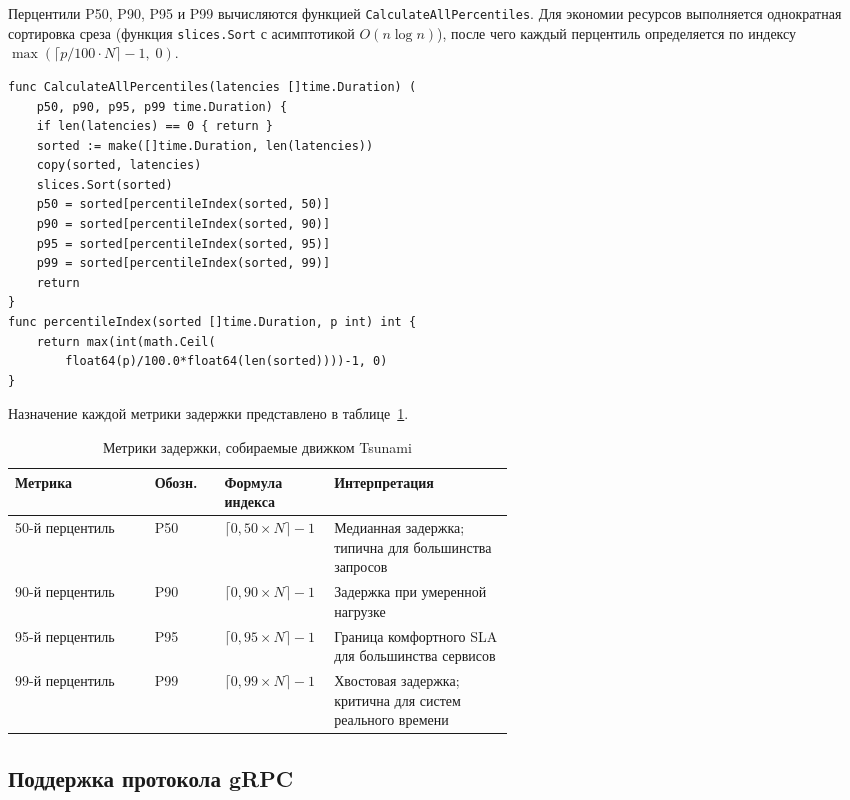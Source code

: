 Перцентили P50, P90, P95 и P99 вычисляются функцией \texttt{Calculate\-All\-Percentiles}.
Для экономии ресурсов выполняется однократная сортировка среза (функция \texttt{slices.Sort} с асимптотикой $O(n \log n)$), после чего каждый перцентиль определяется по индексу \(\max\!\left(\lceil p / 100 \cdot N \rceil - 1,\; 0\right)\).

\begin{lstlisting}[caption={Функция \texttt{CalculateAllPercentiles} и вспомогательная \texttt{percentileIndex}},label={lst:percentile}]
func CalculateAllPercentiles(latencies []time.Duration) (
    p50, p90, p95, p99 time.Duration) {
    if len(latencies) == 0 { return }
    sorted := make([]time.Duration, len(latencies))
    copy(sorted, latencies)
    slices.Sort(sorted)
    p50 = sorted[percentileIndex(sorted, 50)]
    p90 = sorted[percentileIndex(sorted, 90)]
    p95 = sorted[percentileIndex(sorted, 95)]
    p99 = sorted[percentileIndex(sorted, 99)]
    return
}
func percentileIndex(sorted []time.Duration, p int) int {
    return max(int(math.Ceil(
        float64(p)/100.0*float64(len(sorted))))-1, 0)
}
\end{lstlisting}

Назначение каждой метрики задержки представлено в таблице~\ref{tab:ch2-percentiles}.

\begin{table}[h!]
  \centering
  \caption{Метрики задержки, собираемые движком Tsunami}
  \label{tab:ch2-percentiles}
  \small
  \begin{tabular}{|l|l|p{0.22\linewidth}|p{0.36\linewidth}|}
    \hline
    \textbf{Метрика} & \textbf{Обозн.} & \textbf{Формула индекса} & \textbf{Интерпретация} \\
    \hline
    50-й перцентиль & P50 & $\lceil 0{,}50 \times N \rceil - 1$ & Медианная задержка; типична для большинства запросов \\
    \hline
    90-й перцентиль & P90 & $\lceil 0{,}90 \times N \rceil - 1$ & Задержка при умеренной нагрузке \\
    \hline
    95-й перцентиль & P95 & $\lceil 0{,}95 \times N \rceil - 1$ & Граница комфортного SLA для большинства сервисов \\
    \hline
    99-й перцентиль & P99 & $\lceil 0{,}99 \times N \rceil - 1$ & Хвостовая задержка; критична для систем реального времени \\
    \hline
  \end{tabular}
\end{table}

\subsection*{Поддержка протокола gRPC}

